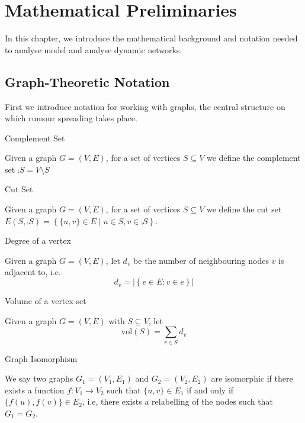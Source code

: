 \chapter{Mathematical Preliminaries}
\label{chapter:Prelims}

In this chapter, we introduce the mathematical background and notation needed to analyse model and analyse dynamic networks.

\section{Graph-Theoretic Notation}\label{section:graphNotation}

First we introduce notation for working with graphs, the central structure on which rumour spreading takes place.

\begin{definition}
	Complement Set

	\noindent
	Given a graph $G = (V, E)$, for a set of vertices $S \subseteq V$ we define the complement set $\comp{S} = V \setminus S$
\end{definition}

\begin{definition}
	Cut Set

	\noindent
	Given a graph $G = (V, E)$, for a set of vertices $S \subseteq V$ we define the cut set $ E(S, \comp{S}) = \left\{\{u, v\} \in E \mid u \in S, v \in \comp{S} \right\}.$
\end{definition}

\begin{definition}
	Degree of a vertex

	\noindent
	Given a graph $G = (V, E)$, let $d_v$ be the number of neighbouring nodes $v$ is adjacent to, i.e. $$
		d_v = |\left\{ e \in E : v \in e \right\}|
	$$
\end{definition}

\begin{definition}
	Volume of a vertex set

	\noindent
	Given a graph $G = (V, E)$ with $S \subseteq V$, let 
	$$
		\text{vol}(S) = \sum_{v \in S} d_v
	$$
\end{definition}

\begin{definition}
	Graph Isomorphism

	\noindent		
	We say two graphs $G_1 = (V_1, E_1)$ and $G_2 = (V_2, E_2)$ are isomorphic if there exists a function $f: V_1 \to V_2$ such that $\{u, v\} \in E_1$ if and only if $\{f(u), f(v)\} \in E_2$, i.e, there exists a relabelling of the nodes such that $G_1=G_2$.
\end{definition}

